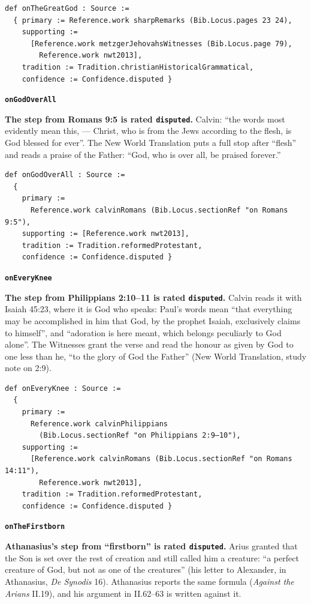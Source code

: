 \documentclass[11pt,paper=\testimonypaper,DIV=13,parskip=false]{scrartcl}
\begin{document}
{\small\begin{verbatim}
def onTheGreatGod : Source :=
  { primary := Reference.work sharpRemarks (Bib.Locus.pages 23 24),
    supporting :=
      [Reference.work metzgerJehovahsWitnesses (Bib.Locus.page 79),
        Reference.work nwt2013],
    tradition := Tradition.christianHistoricalGrammatical,
    confidence := Confidence.disputed }
\end{verbatim}}
\par\medskip\noindent\textbf{\texttt{on\allowbreak{}God\allowbreak{}Over\allowbreak{}All}}\par\nobreak\noindent
\textbf{The step from Romans 9:5 is rated \texttt{disputed}.} Calvin: “the words most evidently mean this, — Christ, who is from the Jews according to the flesh, is God blessed for ever”. The New World Translation puts a full stop after “flesh” and reads a praise of the Father: “God, who is over all, be praised forever.”

{\small\begin{verbatim}
def onGodOverAll : Source :=
  {
    primary :=
      Reference.work calvinRomans (Bib.Locus.sectionRef "on Romans 9:5"),
    supporting := [Reference.work nwt2013],
    tradition := Tradition.reformedProtestant,
    confidence := Confidence.disputed }
\end{verbatim}}
\par\medskip\noindent\textbf{\texttt{on\allowbreak{}Every\allowbreak{}Knee}}\par\nobreak\noindent
\textbf{The step from Philippians 2:10–11 is rated \texttt{disputed}.} Calvin reads it with Isaiah 45:23, where it is God who speaks: Paul’s words mean “that everything may be accomplished in him that God, by the prophet Isaiah, exclusively claims to himself”, and “adoration is here meant, which belongs peculiarly to God alone”. The Witnesses grant the verse and read the honour as given by God to one less than he, “to the glory of God the Father” (New World Translation, study note on 2:9).

{\small\begin{verbatim}
def onEveryKnee : Source :=
  {
    primary :=
      Reference.work calvinPhilippians
        (Bib.Locus.sectionRef "on Philippians 2:9–10"),
    supporting :=
      [Reference.work calvinRomans (Bib.Locus.sectionRef "on Romans 14:11"),
        Reference.work nwt2013],
    tradition := Tradition.reformedProtestant,
    confidence := Confidence.disputed }
\end{verbatim}}
\par\medskip\noindent\textbf{\texttt{on\allowbreak{}The\allowbreak{}Firstborn}}\par\nobreak\noindent
\textbf{Athanasius’s step from “firstborn” is rated \texttt{disputed}.} Arius granted that the Son is set over the rest of creation and still called him a creature: “a perfect creature of God, but not as one of the creatures” (his letter to Alexander, in Athanasius, \emph{De Synodis} 16). Athanasius reports the same formula (\emph{Against the Arians} II.19), and his argument in II.62–63 is written against it.
\end{document}
